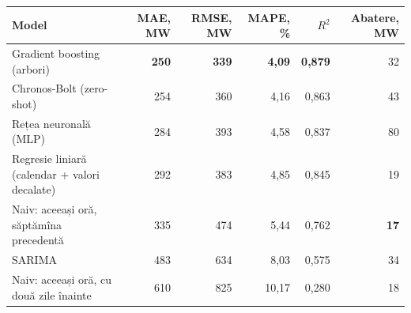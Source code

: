 \begin{tabular}{lrrrrr}
\toprule
Model & MAE, MW & RMSE, MW & MAPE, \% & $R^2$ & Abatere, MW \\
\midrule
Gradient boosting (arbori) & \textbf{250} & \textbf{339} & \textbf{4,09} & \textbf{0,879} & 32 \\
Chronos-Bolt (zero-shot) & 254 & 360 & 4,16 & 0,863 & 43 \\
Rețea neuronală (MLP) & 284 & 393 & 4,58 & 0,837 & 80 \\
Regresie liniară (calendar + valori decalate) & 292 & 383 & 4,85 & 0,845 & 19 \\
Naiv: aceeași oră, săptămîna precedentă & 335 & 474 & 5,44 & 0,762 & \textbf{17} \\
SARIMA & 483 & 634 & 8,03 & 0,575 & 34 \\
Naiv: aceeași oră, cu două zile înainte & 610 & 825 & 10,17 & 0,280 & 18 \\
\bottomrule
\end{tabular}
